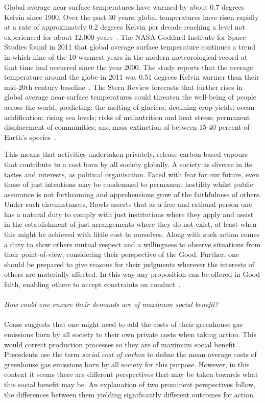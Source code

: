 \documentclass[11pt, oneside]{book}   	%
\begin{document}
Global average near-surface temperatures have warmed by about 0.7 degrees Kelvin since 1900.
Over the past 30 years, global temperatures have risen rapidly at a rate of approximately 0.2 degrees Kelvin per decade reaching a level not experienced for about 12,000 years~\cite{hj1}.
The NASA Goddard Institute for Space Studies found in 2011 that global average surface temperature continues a trend in which nine of the 10 warmest years in the modern meteorological record at that time had occurred since the year 2000.
The study reports that the average temperature around the globe in 2011 was 0.51 degrees Kelvin warmer than their mid-20th century baseline~\cite{candm1}.
The Stern Review forecasts that further rises in global average near-surface temperatures could threaten the well-being of people across the world, predicting: the melting of glaciers; declining crop yields; ocean acidification; rising sea levels; risks of malnutrition and heat stress; permanent displacement of communities; and mass extinction of between 15-40 percent of Earth's species~\cite{ns1}.\

This means that activities undertaken privately, release carbon-based vapours that contribute to a cost born by all society globally.
A society as diverse in its tastes and interests, as political organisation.
Faced with fear for our future, even those of just intentions may be condemned to permanent hostility whilst public assurance is not forthcoming and apprehensions grow of the faithfulness of others.
Under such circumstances, Rawls asserts that as a free and rational person one has a natural duty to comply with just institutions where they apply and assist in the establishment of just arrangements where they do not exist, at least when this might be achieved with little cost to ourselves.
Along with such action comes a duty to show others mutual respect and a willingness to observe situations from their point-of-view, considering their perspective of the Good.
Further, one should be prepared to give reasons for their judgments wherever the interests of others are materially affected. In this way any proposition can be offered in Good faith, enabling others to accept constraints on conduct~\cite{jr1}.\\
\\
 \emph{How could one ensure their demands are of maximum social benefit?}\\
 \\
Coase suggests that one might need to add the costs of their greenhouse gas emissions born by all society to their own private costs when taking action.
This would correct production processes so they are of maximum social benefit~\cite{rc1}.
Precedents use the term \emph{social cost of carbon} to define the mean average costs of greenhouse gas emissions born by all society for this purpose.
However, in this context it seems there are different perspectives that may be taken towards what this social benefit may be.
An explanation of two prominent perspectives follow, the differences between them yielding significantly different outcomes for action.
\end{document}
